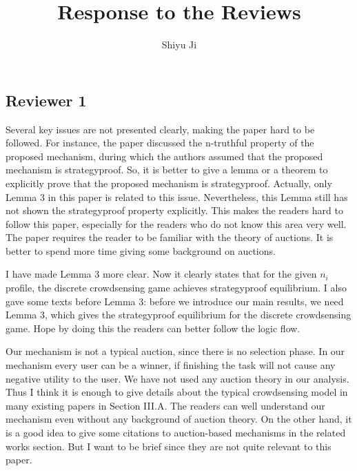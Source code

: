 \documentclass[a4paper,11pt]{exam}
\begin{document}
\title{Response to the Reviews}
\author{Shiyu Ji}
\maketitle

\begin{questions}
\section{Reviewer 1}
\question Several key issues are not presented clearly, making the paper hard to be followed. For instance, the paper discussed the n-truthful property of the proposed mechanism, during which the authors assumed that the proposed mechanism is strategyproof. So, it is better to give a lemma or a theorem to explicitly prove that the proposed mechanism is strategyproof. Actually, only Lemma 3 in this paper is related to this issue. Nevertheless, this Lemma still has not shown the strategyproof property explicitly. This makes the readers hard to follow this paper, especially for the readers who do not know this area very well. The paper requires the reader to be familiar with the theory of auctions. It is better to spend more time giving some background on auctions. 
\begin{solution}
I have made Lemma 3 more clear. Now it clearly states that for the given $n_i$ profile, the discrete crowdsensing game achieves strategyproof equilibrium. I also gave some texts before Lemma 3: before we introduce our main results, we need Lemma 3, which gives the strategyproof equilibrium for the discrete crowdsensing game. Hope by doing this the readers can better follow the logic flow.

Our mechanism is not a typical auction, since there is no selection phase. In our mechanism every user can be a winner, if finishing the task will not cause any negative utility to the user. We have not used any auction theory in our analysis. Thus I think it is enough to give details about the typical crowdsensing model in many existing papers in Section III.A. The readers can well understand our mechanism even without any background of auction theory. On the other hand, it is a good idea to give some citations to auction-based mechanisms in the related works section. But I want to be brief since they are not quite relevant to this paper.
\end{solution}


\end{questions}
\end{document}
